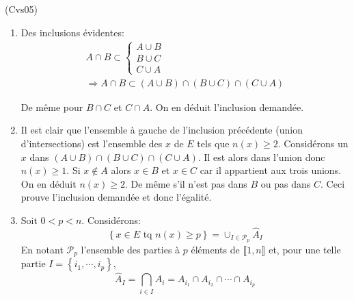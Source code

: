 \begin{tiny}(Cvs05)\end{tiny}
\begin{enumerate}
  \item Des inclusions évidentes:
\begin{multline*}
  A\cap B \subset
  \left\lbrace 
  \begin{aligned}
    A \cup B \\ B\cup C \\ C \cup A
  \end{aligned}
  \right. \\
  \Rightarrow
A\cap B \subset  (A \cup B) \cap (B\cup C) \cap (C \cup A) 
\end{multline*}

De même pour $B\cap C$ et $C\cap A$. On en déduit l'inclusion demandée.

  \item Il est clair que l'ensemble à gauche de l'inclusion précédente (union d'intersections) est l'ensemble des $x$ de $E$ tels que $n(x)\geq 2$.\newline
  Considérons un $x$ dans $(A\cup B)\cap (B\cup C) \cap (C\cup A)$. Il est alors dans l'union donc $n(x)\geq 1$. Si $x\notin A$ alors $x\in B$ et $x\in C$ car il appartient aux trois unions. On en déduit $n(x)\geq 2$. De même s'il n'est pas dans $B$ ou pas dans $C$. Ceci prouve l'inclusion demandée et donc l'égalité.
  
  \item Soit $0< p <n$. Considérons:
 \begin{displaymath}
   \left\lbrace x\in E \text{ tq } n(x)\geq p\right\rbrace
= \cup_{I\in \mathcal{P}_p}\hat{A}_I
 \end{displaymath}
En notant $\mathcal{P}_p$ l'ensemble des parties à $p$ éléments de $\llbracket 1, n\rrbracket$ et, pour une telle partie $I=\left\lbrace i_1,\cdots, i_p \right\rbrace$,
\begin{displaymath}
  \hat{A}_I = \bigcap_{i\in I}A_i = A_{i_1}\cap A_{i_2}\cap \cdots \cap A_{i_p} 
\end{displaymath}

\end{enumerate}
